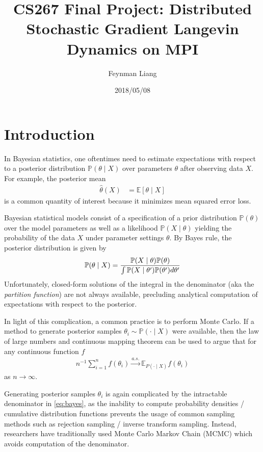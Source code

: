 \documentclass{article}
\title{CS267 Final Project: Distributed Stochastic Gradient Langevin Dynamics on MPI}
\author{Feynman Liang}
\date{2018/05/08}
\newcommand{\ex}{\mathbb{E}}
\newcommand{\pr}{\mathbb{P}}
\begin{document}
\maketitle

\section{Introduction}

In Bayesian statistics, one oftentimes need to estimate expectations with respect
to a posterior distribution $\pr(\theta \mid X)$ over parameters $\theta$ after
observing data $X$. For example, the posterior mean
\begin{align}
  \hat\theta(X) &= \ex[\theta \mid X]
\end{align}
is a common quantity of interest because it minimizes mean squared error loss.

Bayesian statistical models consist of a specification of a prior distribution $\pr(\theta)$
over the model parameters as well as a likelihood $\pr(X \mid \theta)$ yielding the probability
of the data $X$ under parameter settings $\theta$. By Bayes rule, the posterior distribution
is given by
\begin{align}
  \label{eq:bayes}
  \pr(\theta \mid X) = {\pr(X \mid \theta) \pr(\theta) \over \int \pr(X \mid \theta') \pr(\theta') d \theta'}
\end{align}
Unfortunately, closed-form solutions of the integral in the denominator
(aka the \emph{partition function}) are not always available, precluding
analytical computation of expectations with respect to the posterior.

In light of this complication, a common practice is to perform Monte Carlo.
If a method to generate posterior samples $\theta_i \sim \pr(\cdot \mid X)$ were available,
then the law of large numbers and continuous mapping theorem can be used to argue
that for any continuous function $f$
\begin{align}
  n^{-1} \sum_{i=1}^n f(\theta_i) \overset{a.s.}{\to} \ex_{P(\cdot \mid X)} f(\theta_i)
\end{align}
as $n \to \infty$.

Generating posterior samples $\theta_i$ is again complicated by the intractable denominator
in \cref{eq:bayes}, as the inability to compute probability densities / cumulative distribution
functions prevents the usage of common sampling methods such as rejection sampling / inverse transform sampling.
Instead, researchers have traditionally used Monte Carlo Markov Chain (MCMC) \citep{metropolis1949monte}
which avoids computation of the denominator.
\end{document}
